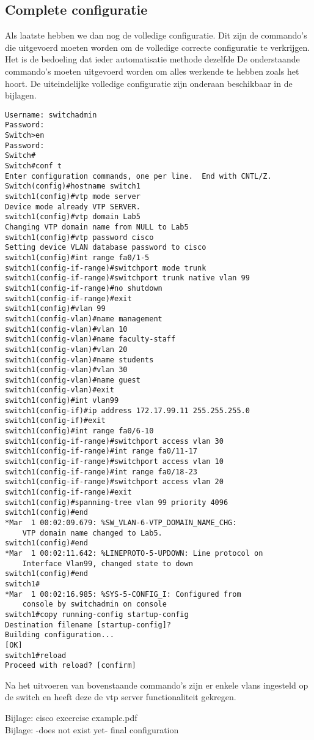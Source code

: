 \subsection{Complete configuratie}
\label{sec:complete configuratie}
Als laatste hebben we dan nog de volledige configuratie. Dit zijn de commando's die uitgevoerd moeten worden om de volledige correcte configuratie te verkrijgen. Het is de bedoeling dat ieder automatisatie methode dezelfde  De onderstaande commando's moeten uitgevoerd worden om alles werkende te hebben zoals het hoort. De uiteindelijke volledige configuratie zijn onderaan beschikbaar in de bijlagen. 
\begin{center}
\begin{verbatim}
Username: switchadmin
Password: 
Switch>en
Password: 
Switch#
Switch#conf t
Enter configuration commands, one per line.  End with CNTL/Z.
Switch(config)#hostname switch1
switch1(config)#vtp mode server
Device mode already VTP SERVER.
switch1(config)#vtp domain Lab5
Changing VTP domain name from NULL to Lab5
switch1(config)#vtp password cisco
Setting device VLAN database password to cisco
switch1(config)#int range fa0/1-5
switch1(config-if-range)#switchport mode trunk
switch1(config-if-range)#switchport trunk native vlan 99
switch1(config-if-range)#no shutdown
switch1(config-if-range)#exit
switch1(config)#vlan 99
switch1(config-vlan)#name management
switch1(config-vlan)#vlan 10
switch1(config-vlan)#name faculty-staff
switch1(config-vlan)#vlan 20
switch1(config-vlan)#name students
switch1(config-vlan)#vlan 30
switch1(config-vlan)#name guest
switch1(config-vlan)#exit
switch1(config)#int vlan99
switch1(config-if)#ip address 172.17.99.11 255.255.255.0
switch1(config-if)#exit
switch1(config)#int range fa0/6-10
switch1(config-if-range)#switchport access vlan 30
switch1(config-if-range)#int range fa0/11-17
switch1(config-if-range)#switchport access vlan 10
switch1(config-if-range)#int range fa0/18-23
switch1(config-if-range)#switchport access vlan 20
switch1(config-if-range)#exit
switch1(config)#spanning-tree vlan 99 priority 4096
switch1(config)#end
*Mar  1 00:02:09.679: %SW_VLAN-6-VTP_DOMAIN_NAME_CHG: 
    VTP domain name changed to Lab5.
switch1(config)#end
*Mar  1 00:02:11.642: %LINEPROTO-5-UPDOWN: Line protocol on 
    Interface Vlan99, changed state to down
switch1(config)#end
switch1#
*Mar  1 00:02:16.985: %SYS-5-CONFIG_I: Configured from 
    console by switchadmin on console
switch1#copy running-config startup-config
Destination filename [startup-config]? 
Building configuration...
[OK]
switch1#reload
Proceed with reload? [confirm]
\end{verbatim}
\end{center}

Na het uitvoeren van bovenstaande commando's zijn er enkele vlans ingesteld op de switch en heeft deze de vtp server functionaliteit gekregen.

Bijlage: cisco excercise example.pdf\\
Bijlage: -does not exist yet- final configuration


